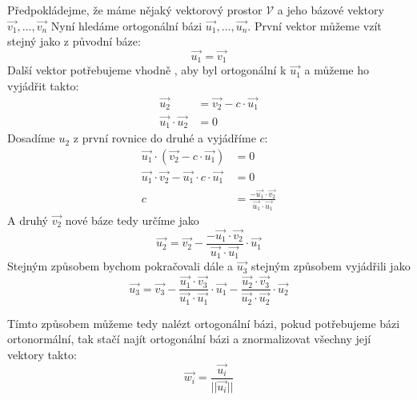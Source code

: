 Předpokládejme, že máme nějaký vektorový prostor $\mathcal{V}$ a jeho bázové
vektory $\vec{v_1}, \ldots, \vec{v_n}$
Nyní hledáme ortogonální bázi $\vec{u_1}, \ldots, \vec{u_n}$.
První vektor můžeme vzít stejný jako z původní báze:
$$\vec{u_1} = \vec{v_1}$$
Další vektor potřebujeme vhodně , aby byl ortogonální
k $\vec{u_1}$ a můžeme ho vyjádřit takto:
\begin{align*}
    \vec{u_2} &= \vec{v_2} - c \cdot \vec{u_1}\\
    \vec{u_1} \cdot \vec{u_2} &= 0
\end{align*}
Dosadíme $u_2$ z první rovnice do druhé a vyjádříme $c$:
\begin{align*}
    \vec{u_1} \cdot (\vec{v_2} - c \cdot \vec{u_1}) &= 0\\
    \vec{u_1} \cdot \vec{v_2} - \vec{u_1} \cdot c \cdot \vec{u_1} &= 0\\
    c &= \frac{-\vec{u_1} \cdot \vec{v_2}}{\vec{u_1}\cdot \vec{u_1}}
\end{align*}
A druhý  $\vec{v_2}$ nové báze tedy určíme jako
$$\vec{u_2} = \vec{v_2} - \frac{-\vec{u_1} \cdot \vec{v_2}}{\vec{u_1}\cdot
    \vec{u_1}} \cdot \vec{u_1}$$
Stejným způsobem bychom pokračovali dále a $\vec{u_3}$ stejným způsobem vyjádřili
jako
$$\vec{u_3} = \vec{v_3} - \frac{\vec{u_1}\cdot \vec{v_3}}{\vec{u_1} \cdot \vec{u_1}}\cdot
    \vec{u_1} - \frac{\vec{u_2}\cdot \vec{v_3}}{\vec{u_2} \cdot \vec{u_2}}\cdot \vec{u_2}$$

Tímto způsobem můžeme tedy nalézt ortogonální bázi, pokud potřebujeme bázi ortonormální, tak
stačí najít ortogonální bázi a znormalizovat všechny její vektory takto:
$$\vec{w_i} = \frac{\vec{u_i}}{||\vec{u_i}||}$$

